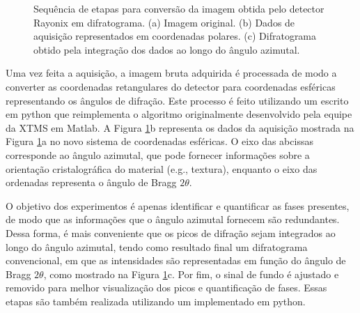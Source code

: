 \begin{figure}
{\begin{minipage}[c][.5\textwidth]{0.6\textwidth}
  \end{minipage}}
  \vspace{0pt}
  \caption{Sequência de etapas para conversão da imagem obtida pelo detector Rayonix em difratograma. (a) Imagem original. (b) Dados de aquisição representados em coordenadas polares. (c) Difratograma obtido pela integração dos dados ao longo do ângulo azimutal.}
  \label{fig:Rayonix_PT300}
\end{figure}

Uma vez feita a aquisição, a imagem bruta adquirida é processada de modo a converter as coordenadas retangulares do detector para coordenadas esféricas representando os ângulos de difração. Este processo é feito utilizando um  escrito em python que reimplementa o algoritmo originalmente desenvolvido pela equipe da XTMS em Matlab\footnotemark. A Figura \ref{fig:Rayonix_PT300}b representa os dados da aquisição mostrada na Figura \ref{fig:Rayonix_PT300}a no novo sistema de coordenadas esféricas. O eixo das abcissas corresponde ao ângulo azimutal, que pode fornecer informações sobre a orientação cristalográfica do material (e.g., textura), enquanto o eixo das ordenadas representa o ângulo de Bragg $2 \theta$.


O objetivo dos experimentos  é apenas identificar e quantificar as fases presentes, de modo que as informações que o ângulo azimutal fornecem são redundantes. Dessa forma, é mais conveniente que os picos de difração sejam integrados ao longo do ângulo azimutal, tendo como resultado final um difratograma convencional, em que as intensidades são representadas em função do ângulo de Bragg $2\theta$, como mostrado na Figura \ref{fig:Rayonix_PT300}c. Por fim, o sinal de fundo é ajustado e removido para melhor visualização dos picos e quantificação de fases. Essas etapas são também realizada utilizando um  implementado em python.

